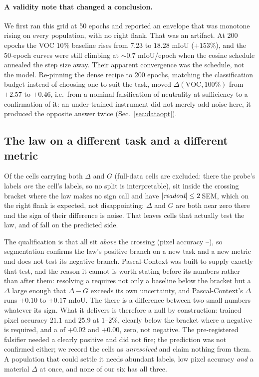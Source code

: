 \paragraph{A validity note that changed a conclusion.} We first ran this grid
at 50 epochs and reported an envelope that was monotone rising on every
population, with no right flank. That was an artifact. At 200 epochs the VOC
$10\%$ baseline rises from $7.23$ to $18.28$ mIoU ($+153\%$), and the 50-epoch
curves were still climbing at ${\sim}0.7$ mIoU/epoch when the cosine schedule
annealed the step size away. Their apparent convergence was the schedule, not
the model. Re-pinning the dense recipe to 200 epochs, matching the
classification budget instead of choosing one to suit the task, moved
$\Delta(\mathrm{VOC},100\%)$ from $+2.57$ to $+0.46$, i.e.\ from a nominal
falsification of neutrality at sufficiency to a confirmation of it: an
under-trained instrument did not merely add noise here, it produced the
opposite answer twice (Sec.~\ref{sec:dataopt}).

\subsection{The law on a different task and a different metric}
Of the \denseLawCells{} cells carrying both $\Delta$ and $G$ (full-data cells
are excluded: there the probe's labels \emph{are} the cell's labels, so no
split is interpretable), \denseLawBracket{} sit inside the crossing bracket
where the law makes no sign call and \denseLawUnres{} have $|\textit{readout}|
\leq 2$\,SEM, which on the right flank is expected, not disappointing: $\Delta$
and $G$ are both near zero there and the sign of their difference is noise.
That leaves \denseLawResolvable{} cells that actually test the law, and
\denseLawCorrect{} of \denseLawResolvable{} fall on the predicted side.

 The qualification is that all \denseLawResolvable{} sit
\emph{above} the crossing (pixel accuracy \denseLawPixLo--\denseLawPixHi), so
segmentation confirms the law's positive branch on a new task and a new metric
and does not test its negative branch. Pascal-Context was built to supply
exactly that test, and the reason it cannot is worth stating before its numbers
rather than after them: resolving a \readout{} requires not only a baseline below
the bracket but a $\Delta$ large enough that $\Delta - G$ exceeds its own
uncertainty, and Pascal-Context's $\Delta$ runs $+0.10$ to $+0.17$ mIoU.
The \readout{} there is a difference between two small numbers whatever its sign. What
it delivers is therefore a null by construction: trained pixel accuracy $21.1$
and $25.9$ at $1$--$2\%$, clearly below the bracket where a negative \readout{} is
required, and a \readout{} of $+0.02$ and $+0.00$, zero, not negative. The
pre-registered falsifier needed a clearly positive \readout{} and did not fire;
the prediction was not confirmed either; we record the cells as
\emph{unresolved} and claim nothing from them. A population that could settle
it needs abundant labels, low pixel accuracy \emph{and} a material $\Delta$ at
once, and none of our six has all three.

